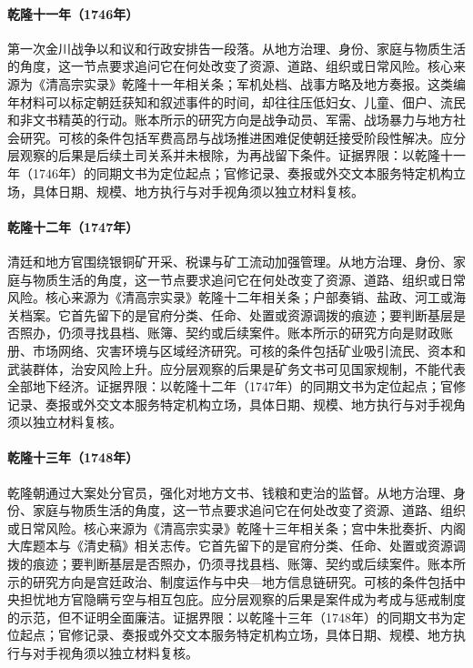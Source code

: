 \hypertarget{social:EQ-1746-FIRST-JINCHUAN-SETTLEMENT}{}\paragraph{乾隆十一年（1746年）}第一次金川战争以和议和行政安排告一段落。从地方治理、身份、家庭与物质生活的角度，这一节点要求追问它在何处改变了资源、道路、组织或日常风险。核心来源为《清高宗实录》乾隆十一年相关条；军机处档、战事方略及地方奏报。这类编年材料可以标定朝廷获知和叙述事件的时间，却往往压低妇女、儿童、佃户、流民和非文书精英的行动。账本所示的研究方向是战争动员、军需、战场暴力与地方社会研究。可核的条件包括军费高昂与战场推进困难促使朝廷接受阶段性解决。应分层观察的后果是后续土司关系并未根除，为再战留下条件。证据界限：以乾隆十一年（1746年）的同期文书为定位起点；官修记录、奏报或外交文本服务特定机构立场，具体日期、规模、地方执行与对手视角须以独立材料复核。
\hypertarget{social:EQ-1747-SOUTHWEST-MINING-REGULATION}{}\paragraph{乾隆十二年（1747年）}清廷和地方官围绕银铜矿开采、税课与矿工流动加强管理。从地方治理、身份、家庭与物质生活的角度，这一节点要求追问它在何处改变了资源、道路、组织或日常风险。核心来源为《清高宗实录》乾隆十二年相关条；户部奏销、盐政、河工或海关档案。它首先留下的是官府分类、任命、处置或资源调拨的痕迹；要判断基层是否照办，仍须寻找县档、账簿、契约或后续案件。账本所示的研究方向是财政账册、市场网络、灾害环境与区域经济研究。可核的条件包括矿业吸引流民、资本和武装群体，治安风险上升。应分层观察的后果是矿务文书可见国家规制，不能代表全部地下经济。证据界限：以乾隆十二年（1747年）的同期文书为定位起点；官修记录、奏报或外交文本服务特定机构立场，具体日期、规模、地方执行与对手视角须以独立材料复核。
\hypertarget{social:EQ-1748-SONG-AND-CASE}{}\paragraph{乾隆十三年（1748年）}乾隆朝通过大案处分官员，强化对地方文书、钱粮和吏治的监督。从地方治理、身份、家庭与物质生活的角度，这一节点要求追问它在何处改变了资源、道路、组织或日常风险。核心来源为《清高宗实录》乾隆十三年相关条；宫中朱批奏折、内阁大库题本与《清史稿》相关志传。它首先留下的是官府分类、任命、处置或资源调拨的痕迹；要判断基层是否照办，仍须寻找县档、账簿、契约或后续案件。账本所示的研究方向是宫廷政治、制度运作与中央—地方信息链研究。可核的条件包括中央担忧地方官隐瞒亏空与相互包庇。应分层观察的后果是案件成为考成与惩戒制度的示范，但不证明全面廉洁。证据界限：以乾隆十三年（1748年）的同期文书为定位起点；官修记录、奏报或外交文本服务特定机构立场，具体日期、规模、地方执行与对手视角须以独立材料复核。
